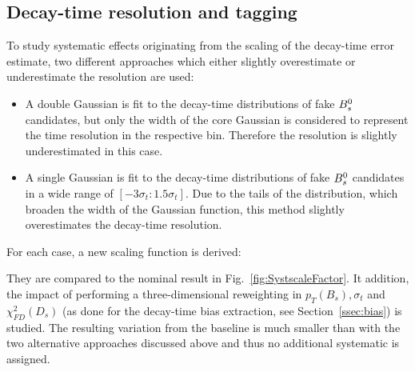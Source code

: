 \subsection{Decay-time resolution and tagging}
\label{ssec:biasSys}

To study systematic effects originating from the scaling of the decay-time error estimate, 
two different approaches which either slightly overestimate or underestimate the resolution are used:
\begin{itemize}

\item A double Gaussian is fit to the decay-time distributions of fake ${{B}^0_{s}}$ candidates, but only the width of the core Gaussian is considered to represent the time resolution in the respective bin. 
Therefore the resolution is slightly underestimated in this case.

\item A single Gaussian is fit to the decay-time distributions of fake ${{B}^0_{s}}$ candidates in a wide range of $[-3\sigma_{t} : 1.5\sigma_{t}]$. 
Due to the tails of the distribution, which broaden the width of the Gaussian function, this method slightly overestimates the decay-time resolution.   

\end{itemize}
%
For each case, a new scaling function is derived: 





%
They are compared to the nominal result in Fig.~\ref{fig:SystscaleFactor}.
It addition, the impact of performing a three-dimensional reweighting in  $p_T(B_s),\sigma_t$ and $\chi^{2}_{FD}(D_s)$ (as done for the decay-time bias extraction, see Section~\ref{ssec:bias}) is studied.
The resulting variation from the baseline is much smaller than with the two alternative approaches discussed above and thus no additional systematic is assigned.

